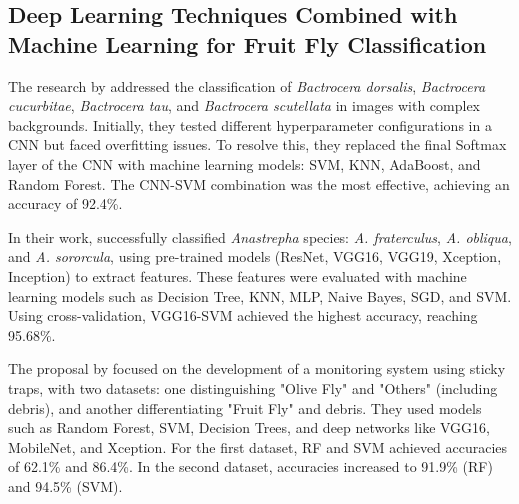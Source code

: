 \subsection{Deep Learning Techniques Combined with Machine Learning for Fruit Fly Classification}

The research by \cite{10Peng2020} addressed the classification of \textit{Bactrocera dorsalis}, \textit{Bactrocera cucurbitae}, \textit{Bactrocera tau}, and \textit{Bactrocera scutellata} in images with complex backgrounds. Initially, they tested different hyperparameter configurations in a CNN but faced overfitting issues. To resolve this, they replaced the final Softmax layer of the CNN with machine learning models: SVM, KNN, AdaBoost, and Random Forest. The CNN-SVM combination was the most effective, achieving an accuracy of 92.4\%.

In their work, \cite{12Leonardo2018} successfully classified \textit{Anastrepha} species: \textit{A. fraterculus}, \textit{A. obliqua}, and \textit{A. sororcula}, using pre-trained models (ResNet, VGG16, VGG19, Xception, Inception) to extract features. These features were evaluated with machine learning models such as Decision Tree, KNN, MLP, Naive Bayes, SGD, and SVM. Using cross-validation, VGG16-SVM achieved the highest accuracy, reaching 95.68\%.

The proposal by \cite{14Molina-Rotger2023} focused on the development of a monitoring system using sticky traps, with two datasets: one distinguishing "Olive Fly" and "Others" (including debris), and another differentiating "Fruit Fly" and debris. They used models such as Random Forest, SVM, Decision Trees, and deep networks like VGG16, MobileNet, and Xception. For the first dataset, RF and SVM achieved accuracies of 62.1\% and 86.4\%. In the second dataset, accuracies increased to 91.9\% (RF) and 94.5\% (SVM).
